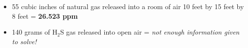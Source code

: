





\begin{itemize}
\item{} 55 cubic inches of natural gas released into a room of air 10 feet by 15 feet by 8 feet = {\bf 26.523 ppm}
\vskip 10pt
\item{} 140 grams of H$_{2}$S gas released into open air = {\it not enough information given to solve!}
\end{itemize}




